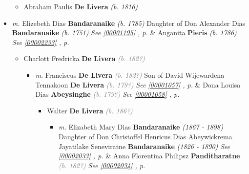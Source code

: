 \documentclass[10pt, openany]{book}
\begin{document}
\begin{itemize}
{\begin{itemize}
{\begin{itemize}
{\begin{itemize}
\item{Christopher \textbf{De Livera} \textcolor{gray}{\textit{(b. 187?)}}
  }
\item{Ethel \textbf{De Livera} \textcolor{gray}{\textit{(b. 187?)}}
  }
\end{itemize}}
\end{itemize}
   }
\item{Abraham Paulis \textbf{De Livera} \textcolor{slorange}{\textit{(b. 1816)}}
   }
\end{itemize}}
\item{\textit{m.} Elizebeth Dias \textbf{Bandaranaike} \textcolor{slorange}{\textit{(b. 1785)}} Daughter of  Don Alexander Dias \textbf{Bandaranaike} \textcolor{slorange}{\textit{(b. 1751)}} \textcolor{slteal}{\textit{See  \autoref{00001195} \textit{, p. \pageref{00001195} }}}  \&  Anganita \textbf{Pieris} \textcolor{slorange}{\textit{(b. 1786)}} \textcolor{slteal}{\textit{See  \autoref{00002233} \textit{, p. \pageref{00002233} }}}   \label{couple:00001193:00001194} \begin{itemize}
\item{Charlott Fredricka \textbf{De Livera} \textcolor{gray}{\textit{(b. 182?)}}
\begin{itemize}
\item{\textit{m.} Franciscus \textbf{De Livera} \textcolor{gray}{\textit{(b. 182?)}} Son of  David Wijewardena Tennakoon \textbf{De Livera} \textcolor{gray}{\textit{(b. 179?)}} \textcolor{slteal}{\textit{See  \autoref{00001057} \textit{, p. \pageref{00001057} }}}  \&  Dona Louisa Dias \textbf{Abeysinghe} \textcolor{gray}{\textit{(b. 179?)}} \textcolor{slteal}{\textit{See  \autoref{00001058} \textit{, p. \pageref{00001058} }}}   \label{couple:00001060:00001062} \begin{itemize}
\item{Walter \textbf{De Livera} \textcolor{gray}{\textit{(b. 186?)}}
\begin{itemize}
\item{\textit{m.} Elizabeth Mary Dias \textbf{Bandaranaike} \textcolor{slorange}{\textit{(1867 - 1898)}} Daughter of  Don Christoffel Henricus Dias Abeywickrema Jayatilake Seneviratne \textbf{Bandaranaike} \textcolor{slorange}{\textit{(1826 - 1890)}} \textcolor{slteal}{\textit{See  \autoref{00002033} \textit{, p. \pageref{00002033} }}}  \&  Anna Florentina Philipsz \textbf{Panditharatne} \textcolor{gray}{\textit{(b. 182?)}} \textcolor{slteal}{\textit{See  \autoref{00002034} \textit{, p. \pageref{00002034} }}}   \label{couple:00001065:00001066} \begin{itemize}

\end{itemize}}
\end{itemize}}
\end{itemize}}
\end{itemize}}
\end{itemize}}
\end{itemize}
\end{document}
